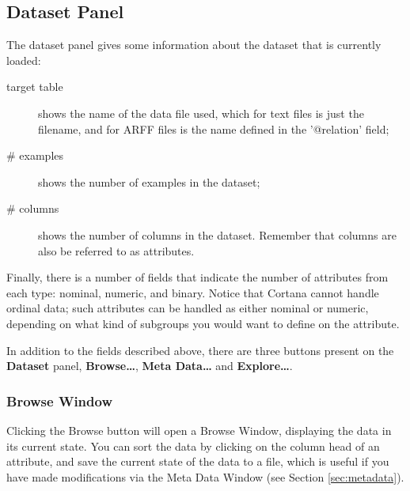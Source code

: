 \documentclass{article}
\begin{document}
\subsection{Dataset Panel}
\label{sec:dataset}


The dataset panel gives some information about the dataset that is currently loaded:
\begin{description}
\item[target table] shows the name of the data file used, which for text files is just the filename, and for ARFF files is the name defined in the '@relation' field;
\item[\# examples] shows the number of examples in the dataset;
\item[\# columns] shows the number of columns in the dataset.
Remember that columns are also be referred to as attributes.
\end{description}
Finally, there is a number of fields that indicate the number of attributes
from each \gls{type}: \gls{nominal}, \gls{numeric}, and \gls{binary}. Notice
that Cortana cannot handle \gls{ordinal} data; such attributes can be
handled as either \gls{nominal} or \gls{numeric}, depending on what kind of
subgroups you would want to define on the attribute.

In addition to the fields described above, there are three buttons present
on the {\bf Dataset} panel, {\bf Browse\ldots}, {\bf Meta Data\ldots} and {\bf
Explore\ldots}.

\subsubsection{Browse Window}

Clicking the Browse button will open a Browse Window, displaying the
data in its current state.  You can sort the data by clicking on the column
head of an attribute, and save the current state of the data to a file,
which is useful if you have made modifications via the Meta Data Window (see
Section \ref{sec:metadata}).

\end{document}
